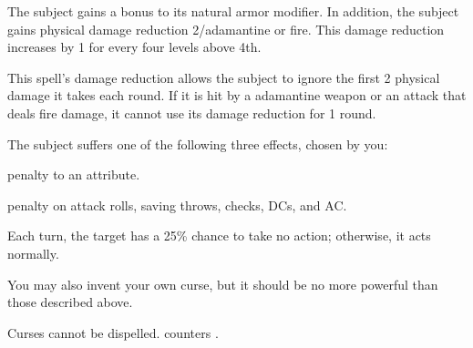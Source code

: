 \spellrng{\rngtouch}
\spelldur{\durshort}
\begin{spelleffect}
  The subject gains a  bonus to its natural armor modifier. \bonusscalingdescription In addition, the subject gains physical damage reduction 2/adamantine or fire. This damage reduction increases by 1 for every four levels above 4th.
\end{spelleffect}
\begin{spellnotes}
  This spell's damage reduction allows the subject to ignore the first 2 physical damage it takes each round. If it is hit by a adamantine weapon or an attack that deals fire damage, it cannot use its damage reduction for 1 round.
\end{spellnotes}

\spellrng{\rngclose}
\begin{spelleffect}
  The subject suffers one of the following three effects, chosen by you:
  \begin{itemize*}
    \item {} penalty to an attribute.
    \item {} penalty on attack rolls, saving throws, checks, DCs, and AC.
    \item Each turn, the target has a 25\% chance to take no action; otherwise, it acts normally.
  \end{itemize*}
  \par You may also invent your own curse, but it should be no more powerful than those described above.
\end{spelleffect}
\begin{spellnotes}
  Curses cannot be dispelled.  counters .
\end{spellnotes}

